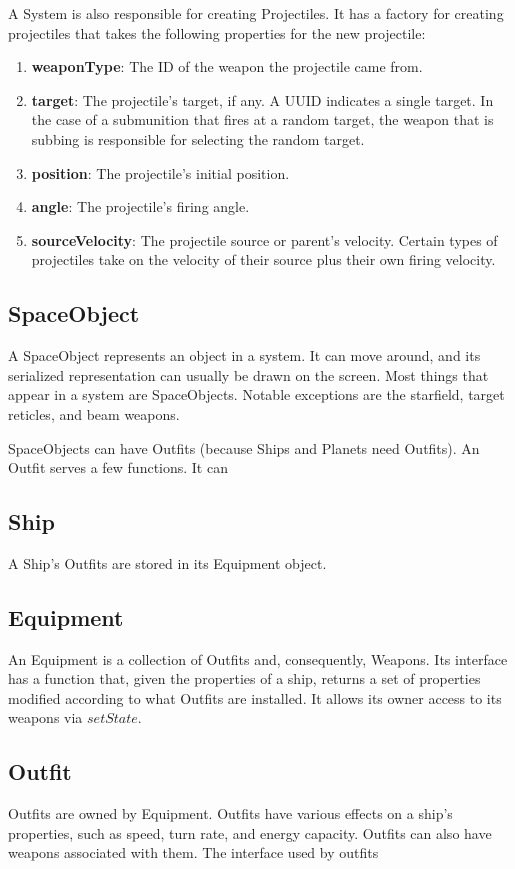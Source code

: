 \documentclass{article}
\begin{document}
A System is also responsible for creating Projectiles. It has a factory for creating projectiles that takes the following properties for the new projectile:
\begin{enumerate}
\item[] \textbf{weaponType}: The ID of the weapon the projectile came from.
\item[] \textbf{target}: The projectile's target, if any. A UUID indicates a single target. In the case of a submunition that fires at a random target, the weapon that is subbing is responsible for selecting the random target.
\item[] \textbf{position}: The projectile's initial position.
\item[] \textbf{angle}: The projectile's firing angle.
\item[] \textbf{sourceVelocity}: The projectile source or parent's velocity. Certain types of projectiles take on the velocity of their source plus their own firing velocity.
\end{enumerate}

\subsection{SpaceObject}
A SpaceObject represents an object in a system. It can move around, and its serialized representation can usually be drawn on the screen. Most things that appear in a system are SpaceObjects. Notable exceptions are the starfield, target reticles, and beam weapons.
 
SpaceObjects can have Outfits (because Ships and Planets need Outfits). An Outfit serves a few functions. It can 

\subsection{Ship}
A Ship's Outfits are stored in its Equipment object.

\subsection{Equipment}
An Equipment is a collection of Outfits and, consequently, Weapons. Its interface has a function that, given the properties of a ship, returns a set of properties modified according to what Outfits are installed. It allows its owner access to its weapons via $setState$.

\subsection{Outfit}
Outfits are owned by Equipment. Outfits have various effects on a ship's properties, such as speed, turn rate, and energy capacity. Outfits can also have weapons associated with them. The interface used by outfits
\end{document}

